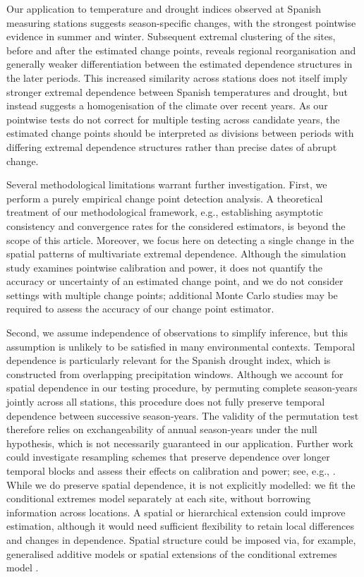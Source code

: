 \documentclass[APA,STIX1COL]{WileyNJD-v2}
\begin{document}
Our application to temperature and drought indices observed at Spanish measuring stations suggests season-specific changes, with the strongest pointwise evidence in summer and winter. Subsequent extremal clustering of the sites, before and after the estimated change points, reveals regional reorganisation and generally weaker differentiation between the estimated dependence structures in the later periods. This increased similarity across stations does not itself imply stronger extremal dependence between Spanish temperatures and drought, but instead suggests a homogenisation of the climate over recent years. As our pointwise tests do not correct for multiple testing across candidate years, the estimated change points should be interpreted as divisions between periods with differing extremal dependence structures rather than precise dates of abrupt change.

Several methodological limitations warrant further investigation. First, we perform a purely empirical change point detection analysis. A theoretical treatment of our methodological framework, e.g., establishing asymptotic consistency and convergence rates for the considered estimators, is beyond the scope of this article. Moreover, we focus here on detecting a single change in the spatial patterns of multivariate extremal dependence. Although the simulation study examines pointwise calibration and power, it does not quantify the accuracy or uncertainty of an estimated change point, and we do not consider settings with multiple change points; additional Monte Carlo studies may be required to assess the accuracy of our change point estimator.

Second, we assume independence of observations to simplify inference, but this assumption is unlikely to be satisfied in many environmental contexts. Temporal dependence is particularly relevant for the Spanish drought index, which is constructed from overlapping precipitation windows. Although we account for spatial dependence in our testing procedure, by permuting complete season-years jointly across all stations, this procedure does not fully preserve temporal dependence between successive season-years. The validity of the permutation test therefore relies on exchangeability of annual season-years under the null hypothesis, which is not necessarily guaranteed in our application. Further work could investigate resampling schemes that preserve dependence over longer temporal blocks and assess their effects on calibration and power; see, e.g., \cite{politis1994stationary}. While we do preserve spatial dependence, it is not explicitly modelled: we fit the conditional extremes model separately at each site, without borrowing information across locations. A spatial or hierarchical extension could improve estimation, although it would need sufficient flexibility to retain local differences and changes in dependence. Spatial structure could be imposed via, for example, generalised additive models \citep{youngman2022evgam} or spatial extensions of the conditional extremes model \citep{wadsworth2022higher,richards2022modelling}.
\end{document}
